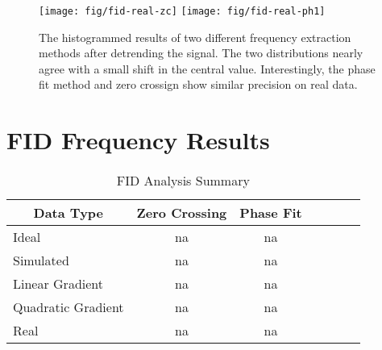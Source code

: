 \begin{figure}
\label{fig:fid-real-freq}
\texttt{[image: fig/fid-real-zc]}
\texttt{[image: fig/fid-real-ph1]}
\caption{The histogrammed results of two different frequency extraction methods after detrending the signal.  The two distributions nearly agree with a small shift in the central value.  Interestingly, the phase fit method and zero crossign show similar precision on real data.}
\end{figure}

\section{FID Frequency Results}

\begin{table}[h]
\label{tab:fid-analysis-summary}
\caption{FID Analysis Summary}
\centering
\begin{tabular}{l c c c c c c}
    \hline
    \multicolumn{1}{c}{Data Type} & Zero Crossing & Phase Fit \\
    \hline
    Ideal                & na & na \\
    Simulated            & na & na \\
    Linear Gradient      & na & na \\
    Quadratic Gradient   & na & na \\
    Real                 & na & na \\
    \hline
\end{tabular}
\end{table}
